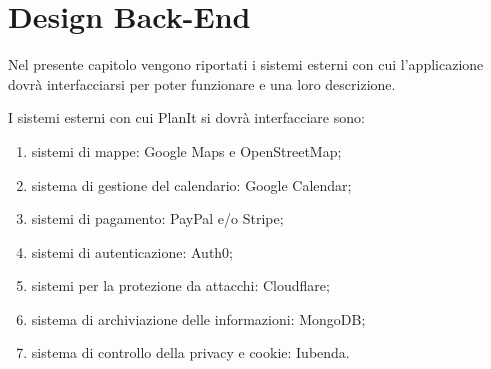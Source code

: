 \section{Design Back-End}
\label{secD1:RequisitiBackEnd}

Nel presente capitolo vengono riportati i sistemi esterni con cui l'applicazione dovrà interfacciarsi per poter funzionare e una loro descrizione.

I sistemi esterni con cui PlanIt si dovrà interfacciare sono:
\begin{enumerate}
    \item sistemi di mappe: Google Maps e OpenStreetMap;
    \item sistema di gestione del calendario: Google Calendar;
    \item sistemi di pagamento: PayPal e/o Stripe;
    \item sistemi di autenticazione: Auth0;
    \item sistemi per la protezione da attacchi: Cloudflare;
    \item sistema di archiviazione delle informazioni: MongoDB;
    \item sistema di controllo della privacy e cookie: Iubenda.
\end{enumerate}

